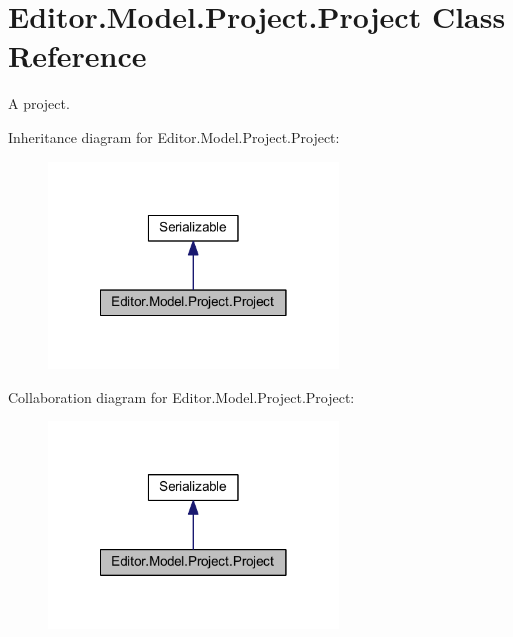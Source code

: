 \section{Editor.\-Model.\-Project.\-Project Class Reference}
\label{class_editor_1_1_model_1_1_project_1_1_project}


A project.  




Inheritance diagram for Editor.\-Model.\-Project.\-Project\-:
\nopagebreak
\begin{figure}[H]
\begin{center}
\leavevmode
\includegraphics[width=218pt]{class_editor_1_1_model_1_1_project_1_1_project__inherit__graph}
\end{center}
\end{figure}


Collaboration diagram for Editor.\-Model.\-Project.\-Project\-:
\nopagebreak
\begin{figure}[H]
\begin{center}
\leavevmode
\includegraphics[width=218pt]{class_editor_1_1_model_1_1_project_1_1_project__coll__graph}
\end{center}
\end{figure}
